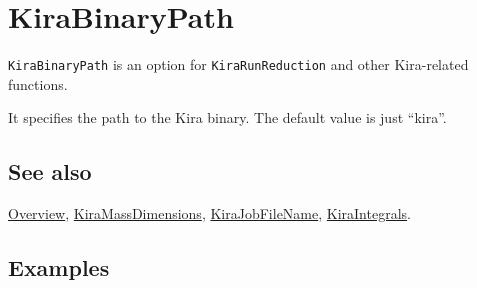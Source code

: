 \documentclass[../FeynHelpersManual.tex]{subfiles}
\begin{document}
\hypertarget{kirabinarypath}{
\section{KiraBinaryPath}\label{kirabinarypath}}

\texttt{KiraBinaryPath} is an option for \texttt{KiraRunReduction} and
other Kira-related functions.

It specifies the path to the Kira binary. The default value is just
``kira''.

\subsection{See also}

\hyperlink{toc}{Overview},
\hyperlink{kiramassdimensions}{KiraMassDimensions},
\hyperlink{kirajobfilename}{KiraJobFileName},
\hyperlink{kiraintegrals}{KiraIntegrals}.

\subsection{Examples}
\end{document}

